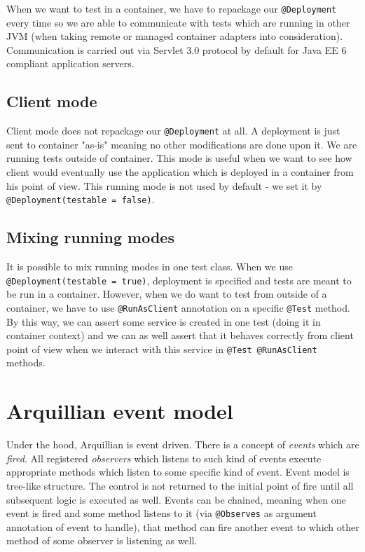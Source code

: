 \documentclass[12pt,final,oneside]{fithesis}
\begin{document}
When we want to test in a container, we have to repackage our \texttt{@Deployment} every time so we are able to communicate with tests which are running in other JVM (when taking remote or managed container adapters into consideration). Communication is carried out via Servlet 3.0 protocol by default for Java EE 6 compliant application servers. 

		\subsection{Client mode}

Client mode does not repackage our \texttt{@Deployment} at all. A deployment is just sent to container "as-is" meaning no other modifications are done upon it. We are running tests outside of container. This mode is useful when we want to see how client would eventually use the application which is deployed in a container from his point of view. This running mode is not used by default - we set it by \texttt{@Deployment(testable = false)}.

		\subsection{Mixing running modes}

It is possible to mix running modes in one test class. When we use \texttt{@Deployment(testable = true)}, deployment is specified and tests are meant to be run in a container. However, when we do want to test from outside of a container, we have to use \texttt{@RunAsClient} annotation on a specific \texttt{@Test} method. By this way, we can assert some service is created in one test (doing it in container context) and we can as well assert that it behaves correctly from client point of view when we interact with this service in \texttt{@Test @RunAsClient} methods.

	\section{Arquillian event model}
	
Under the hood, Arquillian is event driven. There is a concept of \textit{events} which are \textit{fired}. All registered \textit{observers} which listens to such kind of events execute appropriate methods which listen to some specific kind of event. Event model is tree-like structure. The control is not returned to the initial point of fire until all subsequent logic is executed as well. Events can be chained, meaning when one event is fired and some method listens to it (via \texttt{@Observes} as argument annotation of event to handle), that method can fire another event to which other method of some observer is listening as well.
\end{document}
